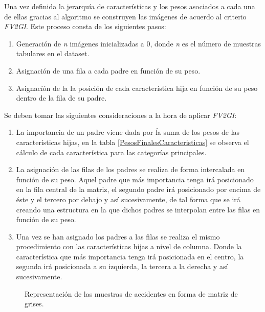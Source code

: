         Una vez definida la jerarquía de características y los pesos asociados a cada una de ellas gracias al algoritmo  se construyen las imágenes de acuerdo al criterio \textit{FV2GI}. Este proceso consta de los siguientes pasos:

        \begin{enumerate}

            \item Generación de \textit{n} imágenes inicializadas a 0, donde \textit{n} es el número de muestras tabulares en el dataset.
            \item Asignación de una fila a cada padre en función de su peso.
            \item Asignacíón de la la posición de cada característica hija en función de su peso dentro de la fila de su padre.
        
        \end{enumerate}

        Se deben tomar las siguientes consideraciones a la hora de aplicar \textit{FV2GI}:

        \begin{enumerate}

            \item La importancia de un padre viene dada por ĺa suma de los pesos de las características hijas, en la tabla \ref{PesosFinalesCaracteristicas} se observa el cálculo de cada característica para las categorías principales.

            \item La asignación de las filas de los padres se realiza de forma intercalada en función de su peso. Aquel padre que más importancia tenga irá posicionado en la fila central de la matriz, el segundo padre irá posicionado por encima de éste y el tercero por debajo y así sucesivamente, de tal forma que se irá creando una estructura en la que dichos padres se interpolan entre las filas en función de su peso.

            \item Una vez se han asignado los padres a las filas se realiza el mismo procedimiento con las características hijas a nivel de columna. Donde la característica que más importancia tenga irá posicionada en el centro, la segunda irá posicionada a su izquierda, la tercera a la derecha y así sucesivamente.
        \end{enumerate}



        \begin{figure}[H]
            \centering
            
            
            

            \caption{Representación de las muestras de accidentes en forma de matriz de grises.}
            \label{SampledImagesExampleImage}
        \end{figure}

